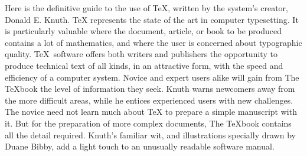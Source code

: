 Here is the definitive guide to the use of \TeX, written by the system's
creator, Donald E. Knuth. \TeX{} represents the state of the art in computer
typesetting. It is particularly valuable where the document, article, or book to
be produced contains a lot of mathematics, and where the user is concerned about
typographic quality. \TeX~software offers both writers and publishers the
opportunity to produce technical text of all kinds, in an attractive form, with
the speed and efficiency of a computer system. Novice and expert users alike
will gain from The \TeX{}book the level of information they seek. Knuth warns
newcomers away from the more difficult areas, while he entices experienced users
with new challenges. The novice need not learn much about \TeX{} to prepare a
simple manuscript with it. But for the preparation of more complex documents,
The \TeX{}book contains all the detail required. Knuth's familiar wit, and
illustrations specially drawn by Duane Bibby, add a light touch to an unusually
readable software manual.
